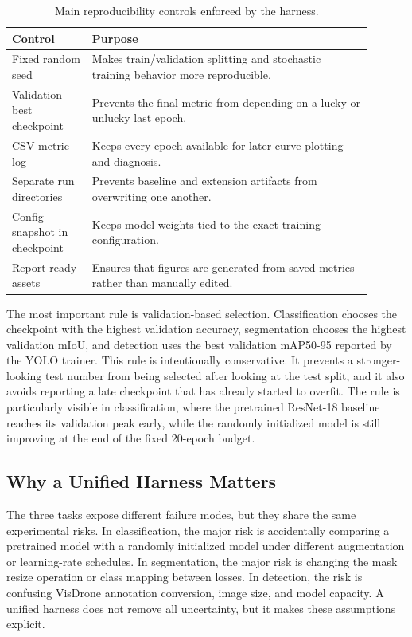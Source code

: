 \documentclass[10pt,twocolumn]{article}
\begin{document}
\begin{table}[!htbp]
\centering
\caption{Main reproducibility controls enforced by the harness.}
\label{tab:appendix_harness}
\scriptsize
\begin{tabular}{p{0.20\linewidth}p{0.70\linewidth}}
\toprule
Control & Purpose\\
\midrule
Fixed random seed & Makes train/validation splitting and stochastic training behavior more reproducible.\\
Validation-best checkpoint & Prevents the final metric from depending on a lucky or unlucky last epoch.\\
CSV metric log & Keeps every epoch available for later curve plotting and diagnosis.\\
Separate run directories & Prevents baseline and extension artifacts from overwriting one another.\\
Config snapshot in checkpoint & Keeps model weights tied to the exact training configuration.\\
Report-ready assets & Ensures that figures are generated from saved metrics rather than manually edited.\\
\bottomrule
\end{tabular}
\end{table}

The most important rule is validation-based selection. Classification chooses the checkpoint with the highest validation accuracy, segmentation chooses the highest validation mIoU, and detection uses the best validation mAP50-95 reported by the YOLO trainer. This rule is intentionally conservative. It prevents a stronger-looking test number from being selected after looking at the test split, and it also avoids reporting a late checkpoint that has already started to overfit. The rule is particularly visible in classification, where the pretrained ResNet-18 baseline reaches its validation peak early, while the randomly initialized model is still improving at the end of the fixed 20-epoch budget.

\subsection{Why a Unified Harness Matters}

The three tasks expose different failure modes, but they share the same experimental risks. In classification, the major risk is accidentally comparing a pretrained model with a randomly initialized model under different augmentation or learning-rate schedules. In segmentation, the major risk is changing the mask resize operation or class mapping between losses. In detection, the risk is confusing VisDrone annotation conversion, image size, and model capacity. A unified harness does not remove all uncertainty, but it makes these assumptions explicit.
\end{document}
